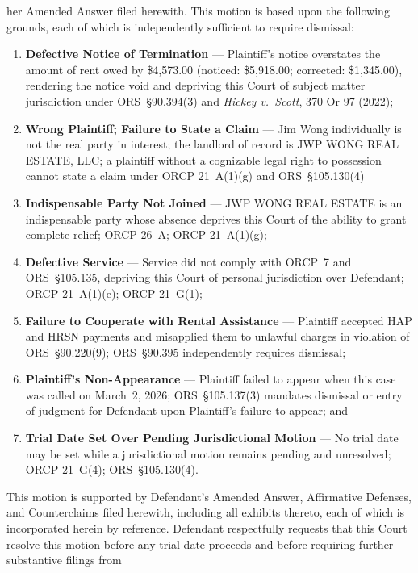 \documentclass[10pt,letterpaper,oneside]{extarticle}
\begin{document}
her Amended Answer filed herewith.
\indent This motion is based upon the following grounds,
each of which is independently sufficient to require
dismissal:
\begin{enumerate}[label=\arabic*.,leftmargin=.5in,
	itemsep=2pt]
	\item \textbf{Defective Notice of Termination} ---
	Plaintiff's notice overstates the amount of rent owed
	by \$4,573.00 (noticed: \$5,918.00; corrected:
	\$1,345.00), rendering the notice void and depriving
	this Court of subject matter jurisdiction under
	ORS~\S90.394(3) and \textit{Hickey v.\ Scott},
	370 Or 97 (2022);
	\item \textbf{Wrong Plaintiff; Failure to State a
		Claim} --- Jim Wong individually is not the real
	party in interest; the landlord of record is JWP WONG
	REAL ESTATE, LLC; a plaintiff without a cognizable
	legal right to possession cannot state a claim under
	ORCP 21~A(1)(g) and ORS~\S105.130(4)
\item \textbf{Indispensable Party Not Joined} ---
JWP WONG REAL ESTATE is an indispensable party whose
absence deprives this Court of the ability to grant
complete relief; ORCP 26~A; ORCP 21~A(1)(g);
\item \textbf{Defective Service} --- Service did not
comply with ORCP~7 and ORS~\S105.135, depriving this
Court of personal jurisdiction over Defendant;
ORCP 21~A(1)(e); ORCP 21~G(1);
\item \textbf{Failure to Cooperate with Rental
	Assistance} --- Plaintiff accepted HAP and HRSN
payments and misapplied them to unlawful charges in
violation of ORS~\S90.220(9); ORS~\S90.395
independently requires dismissal;
\item \textbf{Plaintiff's Non-Appearance} ---
Plaintiff failed to appear when this case was called
on March~2, 2026; ORS~\S105.137(3) mandates
dismissal or entry of judgment for Defendant upon
Plaintiff's failure to appear; and
\item \textbf{Trial Date Set Over Pending
	Jurisdictional Motion} --- No trial date may be set
while a jurisdictional motion remains pending and
unresolved; ORCP 21~G(4); ORS~\S105.130(4).
\end{enumerate}
\indent This motion is supported by Defendant's Amended
Answer, Affirmative Defenses, and Counterclaims filed
herewith, including all exhibits thereto, each of which
is incorporated herein by reference.
\indent Defendant respectfully requests that this Court
resolve this motion before any trial date proceeds and
before requiring further substantive filings from
\end{document}
